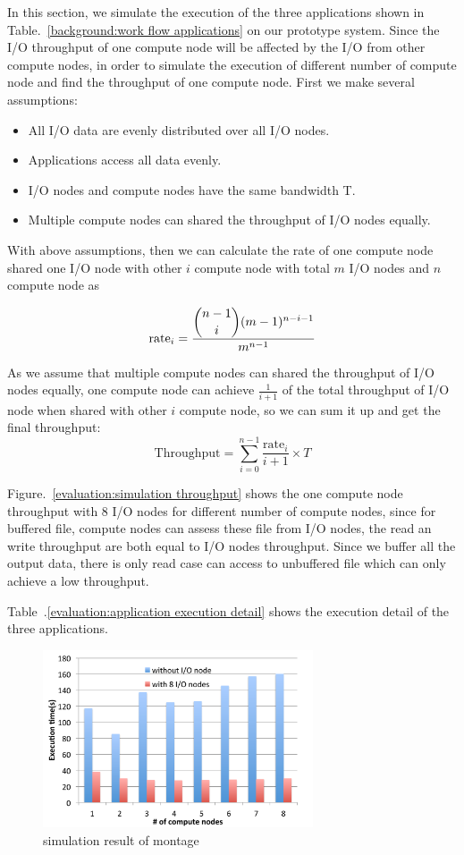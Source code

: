 In this section, we simulate the execution of the three applications shown in
Table.~\ref{background:work flow applications} on our prototype system.
Since the I/O throughput of one compute node will be affected by the I/O from other compute nodes,
in order to simulate the execution of different number of compute node and find the throughput of
one compute node.
First we make several assumptions:
\begin{itemize}
  \item All I/O data are evenly distributed over all I/O nodes.
  \item Applications access all data evenly.
  \item I/O nodes and compute nodes have the same bandwidth T.
  \item Multiple compute nodes can shared the throughput of I/O nodes equally.
\end{itemize}

With above assumptions, then we can calculate the rate of one compute node shared one I/O node with
other $i$ compute node with total $m$ I/O nodes and $n$ compute node as

\begin{equation}
\text{rate}_i=\frac{\dbinom{n-1}{i}(m-1)^{n-i-1}}{m^{n-1}}
\end{equation}

As we assume that multiple compute nodes can shared the throughput of I/O nodes equally, one
compute node can achieve $\frac{1}{i+1}$ of the total throughput of I/O node when shared with other
$i$ compute node, so we can sum it up and get the final throughput:
\begin{equation}
\text{Throughput}=\sum_{i=0}^{n-1} \frac{\text{rate}_i}{i+1} \times T
\end{equation}

Figure.~\ref{evaluation:simulation throughput} shows the one compute node throughput with 8 I/O
nodes for different number of compute nodes, since for buffered file, compute nodes can assess these
file from I/O nodes, the read an write throughput are both equal to I/O nodes throughput.
Since we buffer all the output data, there is only read case can access to unbuffered file which
can only achieve a low throughput.

Table~.\ref{evaluation:application execution detail} shows the execution detail of the three
applications.

\begin{figure}
\centering
\includegraphics[width=8cm]{img/simulation_montage}
\caption{simulation result of montage}
\label{evaluation:simulation result montage}
\end{figure}

